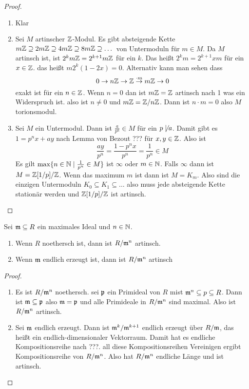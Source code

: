 \begin{proof}
    \begin{enumerate}
        \item Klar
        \item Sei $M$ artinscher $\mathbb{Z}$-Modul. Es gibt absteigende Kette $m\mathbb{Z}\supseteq 2m\mathbb{Z}\supseteq 4m\mathbb{Z}\supseteq 8m\mathbb{Z}\supseteq\dots$ von Untermoduln für $m\in M$.
        Da $M$ artinsch ist, ist $2^km\mathbb{Z}=2^{k+1}m\mathbb{Z}$ für ein $k$.
        Das heißt $2^km=2^{k+1}xm$ für ein $x\in\mathbb{Z}$.
        das heißt $m2^k(1-2x)=0$. 
        Alternativ kann man sehen dass 
        $$0\to n\mathbb{Z}\to \mathbb{Z}\stackrel{\cdot m}\to m\mathbb{Z}\to 0$$ exakt ist für ein $n\in\mathbb{Z}$.
        Wenn $n=0$ dan ist $m\mathbb{Z}=\mathbb{Z}$ artinsch nach 1 was ein Widerspruch ist. also ist $n\neq0$ und $m\mathbb{Z}=\mathbb{Z}/n\mathbb{Z}$. Dann ist $n\cdot m=0$ also $M$ torionsmodul.
        \item Sei $M$ ein Untermodul. Dann ist $\frac{a}{p^n}\in M$ für ein $p\not\mid a$. Damit gibt es $1=p^nx+ay$ nach Lemma von Bezout ??? für $x,y\in\mathbb{Z}$. Also ist 
        $$\frac{ay}{p^n}=\frac{1-p^nx}{p^n}=\frac{1}{p^n}\in M$$
        Es gilt $\max\{n\in\mathbb{N}\mid \frac{1}{p^n}\in M\}$ ist $\infty$ oder $m\in\mathbb{N}$.
        Falls $\infty$ dann ist $M=\mathbb{Z}[1/p]/\mathbb{Z}$.
        Wenn das maximum $m$ ist dann ist $M=K_m$.
        Also sind die einzigen Untermoduln $K_0\subseteq K_1\subseteq\dots$ also muss jede absteigende Kette stationär werden und $\mathbb{Z}[1/p]/\mathbb{Z}$ ist artinsch.
    \end{enumerate}
\end{proof}
\begin{Lemma}
    Sei $\mathfrak{m}\subseteq R$ ein maximales Ideal und $n\in\mathbb{N}$.
    \begin{enumerate}
        \item Wenn $R$ noethersch ist, dann ist $R/\mathfrak{m}^n$ artinsch.
        \item Wenn $\mathfrak{m}$ endlich erzeugt ist, dann ist $R/\mathfrak{m}^n$ artinsch
    \end{enumerate}
\end{Lemma}
\begin{proof}
    \begin{enumerate}
        \item Es ist $R/\mathfrak{m}^n$ noethersch. sei $\mathfrak{p}$ ein Primideal von $R$ mist $\mathfrak{m}^n\subseteq p\subseteq R$.
        Dann ist $\mathfrak{m}\subseteq \mathfrak{p}$ also $\mathfrak{m}=\mathfrak{p}$ und alle Primideale in $R/\mathfrak{m}^n$ sind maximal. Also ist $R/\mathfrak{m}^n$ artinsch.
        \item Sei $\mathfrak{m}$ endlich erzeugt. Dann ist $\mathfrak{m}^k/\mathfrak{m}^{k+1}$ endlich erzeugt über $R/\mathfrak{m}$, das heißt ein endlich-dimensionaler Vektorraum. Damit hat es endliche Kompositionsreihe nach ???.
        all diese Kompositionsreihen Vereinigen ergibt Kompositionsreihe von $R/\mathfrak{m}^n$. Also hat $R/\mathfrak{m}^n$ endliche Länge und ist artinsch.
    \end{enumerate}
\end{proof}

